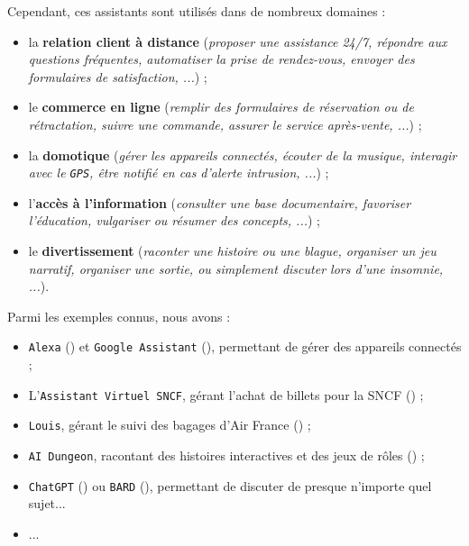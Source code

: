 		
		Cependant, ces assistants sont utilisés dans de nombreux domaines :
		\begin{itemize}
			\item la \textbf{relation client à distance} (\textit{proposer une assistance 24/7, répondre aux questions fréquentes, automatiser la prise de rendez-vous, envoyer des formulaires de satisfaction, ...}) ;
			\item le \textbf{commerce en ligne} (\textit{remplir des formulaires de réservation ou de rétractation, suivre une commande, assurer le service après-vente, ...}) ;
			\item la \textbf{domotique} (\textit{gérer les appareils connectés, écouter de la musique, interagir avec le \texttt{GPS}, être notifié en cas d'alerte intrusion, ...}) ;
			\item l'\textbf{accès à l'information} (\textit{consulter une base documentaire, favoriser l'éducation, vulgariser ou résumer des concepts, ...}) ; 
			\item le \textbf{divertissement} (\textit{raconter une histoire ou une blague, organiser un jeu narratif, organiser une sortie, ou simplement discuter lors d'une insomnie, ...}).
		\end{itemize}
		
		\begin{leftBarExamples}
			Parmi les exemples connus, nous avons :
			\begin{itemize}
				\item \texttt{Alexa} (\cite{alexa-internet:2018:keyword-research-competitor}) et \texttt{Google Assistant} (\cite{google:2016:google-assistant-your}), permettant de gérer des appareils connectés ;
				\item L'\texttt{Assistant Virtuel SNCF}, gérant l'achat de billets pour la SNCF (\cite{sncf:2018:agent-virtuel-sncf}) ;
				\item \texttt{Louis}, gérant le suivi des bagages d'Air France (\cite{air-france:2017:louis}) ;
				\item \texttt{AI Dungeon}, racontant des histoires interactives et des jeux de rôles (\cite{latitude-inc.-oasis-tech-inc.:2019:ai-dungeon}) ;
				\item \texttt{ChatGPT} (\cite{openai:2023:chatgpt}) ou \texttt{BARD} (\cite{google:2023:bard-chat-based}), permettant de discuter de presque n'importe quel sujet...
				\item ...
			\end{itemize}
		\end{leftBarExamples}
	
